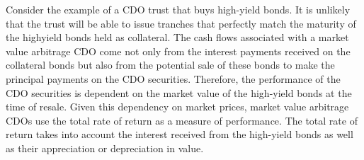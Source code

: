 \documentclass[11pt]{article}
\begin{document}
Consider the example of a CDO trust that buys high-yield bonds. It is unlikely that the trust will be able to issue tranches that perfectly match the maturity of the highyield bonds held as collateral. The cash flows associated with a market value arbitrage CDO come not only from the interest payments received on the collateral bonds but also from the potential sale of these bonds to make the principal payments on the CDO securities. Therefore, the performance of the CDO securities is dependent on the market value of the high-yield bonds at the time of resale. Given this dependency on market prices, market value arbitrage CDOs use the total rate of return as a measure of performance. The total rate of return takes into account the interest received from the high-yield bonds as well as their appreciation or depreciation in value.
\end{document}
